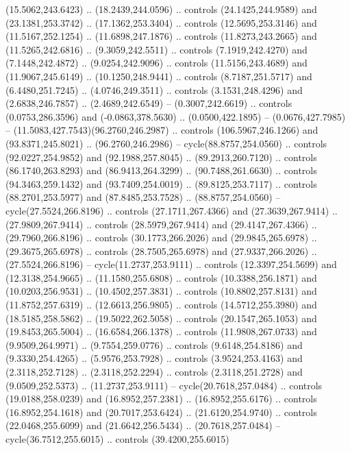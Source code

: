 \begin{scope}[cm={{1.25,0.0,0.0,-1.25,(0.0,743.43331)}}]
    (15.5062,243.6423) .. (18.2439,244.0596) .. controls (24.1425,244.9589) and
    (23.1381,253.3742) .. (17.1362,253.3404) .. controls (12.5695,253.3146) and
    (11.5167,252.1254) .. (11.6898,247.1876) .. controls (11.8273,243.2665) and
    (11.5265,242.6816) .. (9.3059,242.5511) .. controls (7.1919,242.4270) and
    (7.1448,242.4872) .. (9.0254,242.9096) .. controls (11.5156,243.4689) and
    (11.9067,245.6149) .. (10.1250,248.9441) .. controls (8.7187,251.5717) and
    (6.4480,251.7245) .. (4.0746,249.3511) .. controls (3.1531,248.4296) and
    (2.6838,246.7857) .. (2.4689,242.6549) -- (0.3007,242.6619) .. controls
    (0.0753,286.3596) and (-0.0863,378.5630) .. (0.0500,422.1895) --
    (0.0676,427.7985) -- (11.5083,427.7543)(96.2760,246.2987) .. controls
    (106.5967,246.1266) and (93.8371,245.8021) .. (96.2760,246.2986) --
    cycle(88.8757,254.0560) .. controls (92.0227,254.9852) and (92.1988,257.8045)
    .. (89.2913,260.7120) .. controls (86.1740,263.8293) and (86.9413,264.3299) ..
    (90.7488,261.6630) .. controls (94.3463,259.1432) and (93.7409,254.0019) ..
    (89.8125,253.7117) .. controls (88.2701,253.5977) and (87.8485,253.7528) ..
    (88.8757,254.0560) -- cycle(27.5524,266.8196) .. controls (27.1711,267.4366)
    and (27.3639,267.9414) .. (27.9809,267.9414) .. controls (28.5979,267.9414)
    and (29.4147,267.4366) .. (29.7960,266.8196) .. controls (30.1773,266.2026)
    and (29.9845,265.6978) .. (29.3675,265.6978) .. controls (28.7505,265.6978)
    and (27.9337,266.2026) .. (27.5524,266.8196) -- cycle(11.2737,253.9111) ..
    controls (12.3397,254.5699) and (12.3138,254.9665) .. (11.1580,255.6808) ..
    controls (10.3388,256.1871) and (10.0203,256.9531) .. (10.4502,257.3831) ..
    controls (10.8802,257.8131) and (11.8752,257.6319) .. (12.6613,256.9805) ..
    controls (14.5712,255.3980) and (18.5185,258.5862) .. (19.5022,262.5058) ..
    controls (20.1547,265.1053) and (19.8453,265.5004) .. (16.6584,266.1378) ..
    controls (11.9808,267.0733) and (9.9509,264.9971) .. (9.7554,259.0776) ..
    controls (9.6148,254.8186) and (9.3330,254.4265) .. (5.9576,253.7928) ..
    controls (3.9524,253.4163) and (2.3118,252.7128) .. (2.3118,252.2294) ..
    controls (2.3118,251.2728) and (9.0509,252.5373) .. (11.2737,253.9111) --
    cycle(20.7618,257.0484) .. controls (19.0188,258.0239) and (16.8952,257.2381)
    .. (16.8952,255.6176) .. controls (16.8952,254.1618) and (20.7017,253.6424) ..
    (21.6120,254.9740) .. controls (22.0468,255.6099) and (21.6642,256.5434) ..
    (20.7618,257.0484) -- cycle(36.7512,255.6015) .. controls (39.4200,255.6015)

\end{scope}
